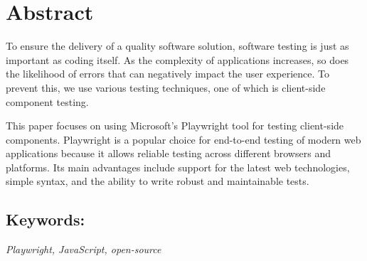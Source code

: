 \section*{Abstract}\label{sazetak_en}
To ensure the delivery of a quality software solution, software testing is just as important as coding itself.
As the complexity of applications increases, so does the likelihood of errors that can negatively impact the user experience.
To prevent this, we use various testing techniques, one of which is client-side component testing.

This paper focuses on using Microsoft's Playwright tool for testing client-side components.
Playwright is a popular choice for end-to-end testing of modern web applications because it allows reliable testing across different browsers and platforms.
Its main advantages include support for the latest web technologies, simple syntax, and the ability to write robust and maintainable tests.

\subsection*{Keywords:}\label{kw_en}
\textit{Playwright, JavaScript, open-source}